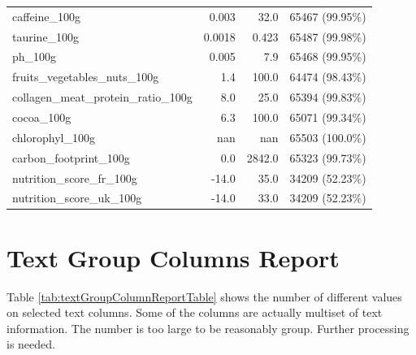 \documentclass[11pt]{article}
\begin{document}
\begin{center}
\begin{longtable}{|l|r|r|r|}
caffeine\_100g& 0.003& 32.0& 65467 (99.95\%)\\
taurine\_100g& 0.0018& 0.423& 65487 (99.98\%)\\
ph\_100g& 0.005& 7.9& 65468 (99.95\%)\\
fruits\_vegetables\_nuts\_100g& 1.4& 100.0& 64474 (98.43\%)\\
collagen\_meat\_protein\_ratio\_100g& 8.0& 25.0& 65394 (99.83\%)\\
cocoa\_100g& 6.3& 100.0& 65071 (99.34\%)\\
chlorophyl\_100g& nan& nan& 65503 (100.0\%)\\
carbon\_footprint\_100g& 0.0& 2842.0& 65323 (99.73\%)\\
nutrition\_score\_fr\_100g& -14.0& 35.0& 34209 (52.23\%)\\
nutrition\_score\_uk\_100g& -14.0& 33.0& 34209 (52.23\%)\\

\hline

\end{longtable}
\end{center}


\section{Text Group Columns Report}
Table \ref{tab:textGroupColumnReportTable} shows the number of different values on selected text columns. Some of the columns are actually multiset of text information. The number is too large to be reasonably group. Further processing is needed.
\end{document}
